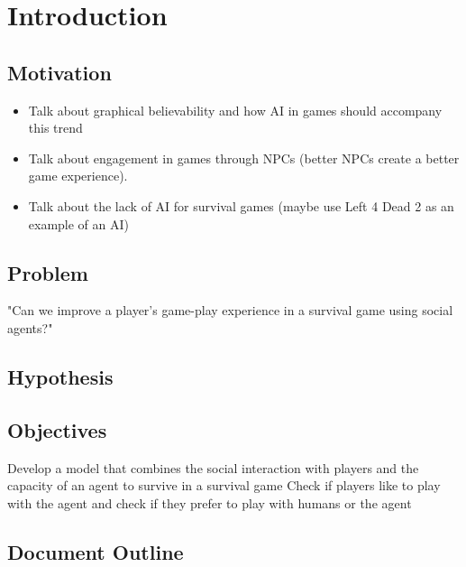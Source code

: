 \section{Introduction}

\subsection{Motivation}

\begin{itemize}
	\item Talk about graphical believability and how AI in games should accompany this trend
	\item Talk about engagement in games through NPCs (better NPCs create a better game experience).
	\item Talk about the lack of AI for survival games (maybe use Left 4 Dead 2 as an example of an AI)
\end{itemize}

\subsection{Problem}
"Can we improve a player's game-play experience in a survival game using social agents?"

\subsection{Hypothesis}


\subsection{Objectives}
Develop a model that combines the social interaction with players and the capacity of an agent to survive in a survival game
Check if players like to play with the agent
and check if they prefer to play with humans or the agent

\subsection{Document Outline}
